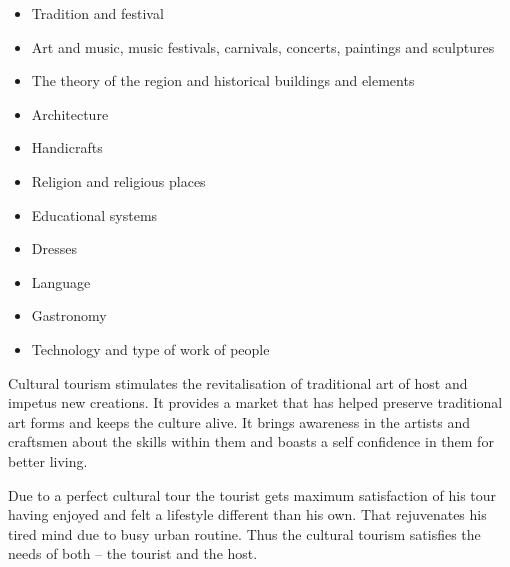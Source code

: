 \begin{itemize}
  \item Tradition and festival
  \item Art and music, music festivals, carnivals, concerts, paintings and sculptures
  \item The theory of the region and historical buildings and elements
  \item Architecture
  \item Handicrafts
  \item Religion and religious places
  \item Educational systems
  \item Dresses
  \item Language
  \item Gastronomy
  \item Technology and type of work of people
\end{itemize}

Cultural tourism stimulates the revitalisation of traditional art of host and impetus new creations. It provides a market that has helped preserve traditional art forms and keeps the culture alive. It brings awareness in the artists and craftsmen about the skills within them and boasts a self confidence in them for better living.

Due to a perfect cultural tour the tourist gets maximum satisfaction of his tour having enjoyed and felt a lifestyle different than his own. That rejuvenates his tired mind due to busy urban routine. Thus the cultural tourism satisfies the needs of both -- the tourist and the host.


